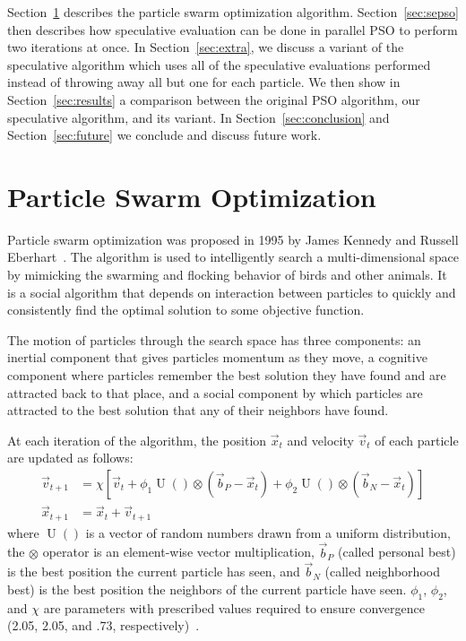 \documentclass[conference,letterpaper]{IEEEtran}
\renewcommand{\sec}[1]{Section~\ref{sec:#1}}
\DeclareMathOperator{\URand}{U}
\providecommand{\ppos}{\ensuremath{\Vec{x}}}
\providecommand{\pvel}{\ensuremath{\Vec{v}}}
\providecommand{\nbest}{\ensuremath{\Vec{b}_N}}
\providecommand{\pbest}{\ensuremath{\Vec{b}_P}}
\providecommand{\constriction}{\ensuremath{\chi}}
\providecommand{\coeff}{\ensuremath{\phi}}
\begin{document}
\sec{pso} describes the particle swarm optimization algorithm.  \sec{sepso}
then describes how speculative evaluation can be done in parallel PSO to
perform two iterations at once.  In \sec{extra}, we discuss a variant of the
speculative algorithm which uses all of the speculative evaluations performed
instead of throwing away all but one for each particle.  We then show in
\sec{results} a comparison between the original PSO algorithm, our speculative
algorithm, and its variant.  In \sec{conclusion} and \sec{future} we conclude
and discuss future work.

\section{Particle Swarm Optimization}
\label{sec:pso}

Particle swarm optimization was proposed in 1995 by James Kennedy and Russell
Eberhart~\cite{kennedy-icnn95}.  The algorithm is used to intelligently search
a multi-dimensional space by mimicking the swarming and flocking behavior of
birds and other animals. It is a social algorithm that depends on interaction
between particles to quickly and consistently find the optimal solution to some
objective function.

The motion of particles through the search space has three components: an
inertial component that gives particles momentum as they move, a cognitive
component where particles remember the best solution they have found and are
attracted back to that place, and a social component by which particles are
attracted to the best solution that any of their neighbors have found.

At each iteration of the algorithm, the position $\ppos_t$ and velocity
$\pvel_t$ of each particle are updated as follows:
\begin{align}
\label{eq:velupdate}
	\pvel_{t+1} &=
		\constriction \left[ \pvel_t +
			\coeff_1\URand()\otimes(\pbest - \ppos_t) +
			\coeff_2\URand()\otimes(\nbest - \ppos_t)
		\right] \\
\label{eq:posupdate}
	\ppos_{t+1} &= \ppos_t + \pvel_{t+1}
\end{align}
where \( \URand() \) is a vector of random numbers drawn from a uniform
distribution, the \( \otimes \) operator is an element-wise vector
multiplication, $\pbest$ (called personal best) is the best position the
current particle has seen, and $\nbest$ (called neighborhood best) is the best
position the neighbors of the current particle have seen.  \( \coeff_1 \), \(
\coeff_2 \), and \( \constriction \) are parameters with prescribed values
required to ensure convergence (2.05, 2.05, and .73,
respectively)~\cite{clerc-tec02}.
\end{document}
